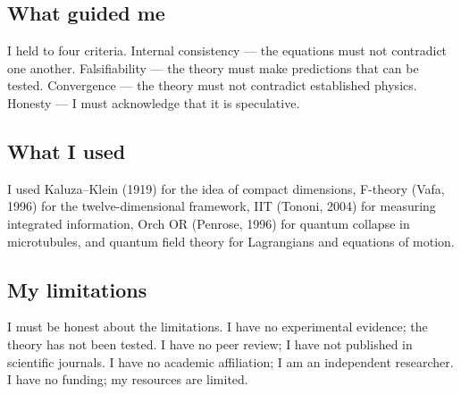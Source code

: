 \subsection{What guided me}
I held to four criteria. Internal consistency --- the equations must not contradict one another. Falsifiability --- the theory must make predictions that can be tested. Convergence --- the theory must not contradict established physics. Honesty --- I must acknowledge that it is speculative.

\subsection{What I used}
I used Kaluza--Klein (1919) for the idea of compact dimensions, F-theory (Vafa, 1996) for the twelve-dimensional framework, IIT (Tononi, 2004) for measuring integrated information, Orch OR (Penrose, 1996) for quantum collapse in microtubules, and quantum field theory for Lagrangians and equations of motion.

\subsection{My limitations}
I must be honest about the limitations. I have no experimental evidence; the theory has not been tested. I have no peer review; I have not published in scientific journals. I have no academic affiliation; I am an independent researcher. I have no funding; my resources are limited.

